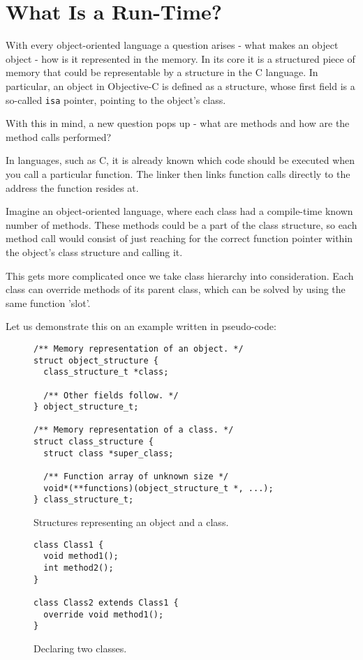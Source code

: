\chapter{What Is a Run-Time?}

With every object-oriented language a question arises - what makes an object object - how is it represented in the memory. In its core it is a structured piece of memory that could be representable by a structure in the C language. In particular, an object in Objective-C is defined as a structure, whose first field is a so-called \verb=isa= pointer, pointing to the object's class.

With this in mind, a new question pops up - what are methods and how are the method calls performed?

In languages, such as C, it is already known which code should be executed when you call a particular function. The linker then links function calls directly to the address the function resides at. 

Imagine an object-oriented language, where each class had a compile-time known number of methods. These methods could be a part of the class structure, so each method call would consist of just reaching for the correct function pointer within the object's class structure and calling it.

This gets more complicated once we take class hierarchy into consideration. Each class can override methods of its parent class, which can be solved by using the same function 'slot'.

Let us demonstrate this on an example written in pseudo-code:

\begin{figure}[H]
  \begin{verbatim}
/** Memory representation of an object. */
struct object_structure {
  class_structure_t *class;
  
  /** Other fields follow. */
} object_structure_t;

/** Memory representation of a class. */
struct class_structure {
  struct class *super_class;
  
  /** Function array of unknown size */
  void*(**functions)(object_structure_t *, ...);
} class_structure_t;
  \end{verbatim}
  \centering{}
  \caption{Structures representing an object and a class.}
  \label{fig:imaginary_lang_structs}
\end{figure}


\begin{figure}[H]
  \begin{verbatim}
class Class1 {
  void method1();
  int method2();
}

class Class2 extends Class1 {
  override void method1();
}
  \end{verbatim}
  \centering{}
  \caption{Declaring two classes.}
  \label{fig:imaginary_lang_classes}
\end{figure}

